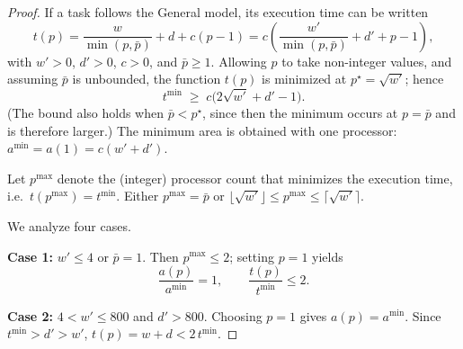 \documentclass{article}
\begin{document}
\begin{proof}
If a task follows the General model, its execution time can be written
\[
t(p)=\frac{w}{\min(p,\bar p)}+d+c(p-1)
     =c\!\left(\frac{w'}{\min(p,\bar p)}+d'+p-1\right),
\]
with $w'>0$, $d'>0$, $c>0$, and $\bar p\ge1$.
Allowing $p$ to take non-integer values, and assuming $\bar p$ is unbounded,
the function $t(p)$ is minimized at
$p^{\star}=\sqrt{w'}$; hence
\[
t^{\min}\;\ge\;c\bigl(2\sqrt{w'}+d'-1\bigr).
\]
(The bound also holds when $\bar p<p^{\star}$, since then the minimum occurs
at $p=\bar p$ and is therefore larger.)
The minimum area is obtained with one processor:
$a^{\min}=a(1)=c(w'+d')$.

Let $p^{\max}$ denote the (integer) processor count that minimizes the
execution time, i.e.\ $t(p^{\max})=t^{\min}$.  
Either $p^{\max}=\bar p$ or
$\lfloor\sqrt{w'}\rfloor\le p^{\max}\le\lceil\sqrt{w'}\rceil$.

We analyze four cases.

\textbf{Case 1:} $w'\le4$ or $\bar p=1$.  
Then $p^{\max}\le2$; setting $p=1$ yields
\[
\frac{a(p)}{a^{\min}}=1,
\qquad
\frac{t(p)}{t^{\min}}\le2.
\]

\textbf{Case 2:} $4<w'\le800$ and $d'>800$.  
Choosing $p=1$ gives $a(p)=a^{\min}$. Since $t^{\min}>d'>w'$,
$t(p)=w+d<2\,t^{\min}$.



\end{proof}
\end{document}

